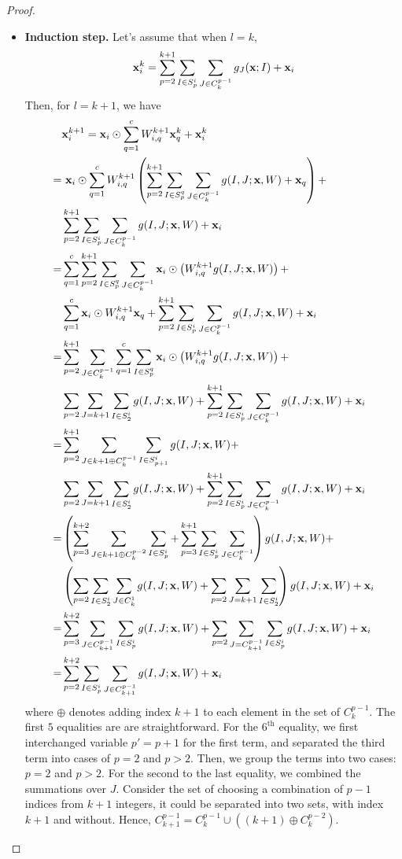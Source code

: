 \documentclass[sigconf]{acmart}
\newcommand{\vecx}{{\bf x}}
\begin{document}
\begin{proof}
\begin{itemize}[leftmargin=0em]
\item[] {\bf Induction step.} Let's assume that when $l = k$, 
$$\vecx_i^k = \sum_{p=2}^{k+1} \sum_{I \in S_p^i} \sum_{J \in C_k^{p-1}} g_J(\vecx; I) + \vecx_i
$$
Then, for $l = k+1$, we have 
\begin{align*}
&\vecx_{i}^{k+1} = \vecx_i \odot \sum_{q=1}^c W_{i, q}^{k+1} \vecx_q^k + \vecx_i^k \\ 
=& ~\vecx_i \odot \sum_{q=1}^c W_{i, q}^{k+1} \left(\sum_{p=2}^{k+1} \sum_{I \in S_p^q} \sum_{J \in C_k^{p-1}} g(I, J; \vecx, W) + \vecx_q\right) + \\
& \sum_{p=2}^{k+1} \sum_{I \in S_p^i} \sum_{J \in C_k^{p-1}} g(I, J; \vecx, W) + \vecx_i \\
=& \sum_{q=1}^c \sum_{p=2}^{k+1} \sum_{I \in S_p^q} \sum_{J \in C_k^{p-1}} \vecx_i \odot \left(W_{i, q}^{k+1} g(I, J; \vecx, W)\right) + \\ 
& \sum_{q=1}^c \vecx_i \odot W_{i, q}^{k+1}\vecx_q+  \sum_{p=2}^{k+1} \sum_{I \in S_p^i } \sum_{J \in C_k^{p-1}} g(I, J; \vecx, W) + \vecx_i\\ 
=&  \sum_{p=2}^{k+1} \sum_{J \in C_k^{p-1}} \sum_{q=1}^c \sum_{I \in S_p^q} \vecx_i \odot \left(W_{i, q}^{k+1} g(I, J; \vecx, W)\right) +\\
& \sum_{p=2} \sum_{J=k+1} \sum_{I \in S_2^i}g(I, J; \vecx, W)+ \sum_{p=2}^{k+1} \sum_{I \in S_p^i } \sum_{J \in C_k^{p-1}} g(I, J; \vecx, W) + \vecx_i\\ 
=&  \sum_{p=2}^{k+1} \sum_{J \in {k+1} \oplus C_k^{p-1}} \sum_{I \in S_{p+1}^i} g(I, J; \vecx, W)+\\
& \sum_{p=2} \sum_{J=k+1} \sum_{I \in S_2^i}g(I, J; \vecx, W)+ \sum_{p=2}^{k+1} \sum_{I \in S_p^i } \sum_{J \in C_k^{p-1}} g(I, J; \vecx, W) + \vecx_i \\ 
=&  \left(\sum_{p=3}^{k+2} \sum_{J \in {k+1} \oplus C_k^{p-2}} \sum_{I \in S_{p}^i}+\sum_{p=3}^{k+1} \sum_{I \in S_p^i } \sum_{J \in C_k^{p-1}}\right) g(I, J; \vecx, W)+\\
& \left(\sum_{p=2} \sum_{I \in S_2^i } \sum_{J \in C_k^1} g(I, J; \vecx, W) + \sum_{p=2} \sum_{J=k+1} \sum_{I \in S_2^i} \right)g(I, J; \vecx, W)+\vecx_i\\
=& \sum_{p=3}^{k+2} \sum_{J \in C_{k+1}^{p-1}} \sum_{I \in S_{p}^i}g(I, J; \vecx, W) +\sum_{p=2} \sum_{J=C_{k+1}^{p-1}} \sum_{I \in S_p^i} g(I, J; \vecx, W)+\vecx_i\\ 
=& \sum_{p=2}^{k+2} \sum_{I \in S_p^i } \sum_{J \in C_{k+1}^{p-1}} g(I, J; \vecx, W) + \vecx_i
\end{align*}
where $\oplus$ denotes adding index $k+1$ to each element in the set of $C_{k}^{p-1}$. The first $5$ equalities are are straightforward.
For the $6^\text{th}$ equality, we first interchanged variable $p' = p+1$ for the first term, and separated the third term into cases of $p=2$ and $p > 2$. Then, we group the terms into two cases: $p=2$ and $p>2$. 
For the second to the last equality, we combined the summations over $J$. Consider the set of choosing a combination of $p-1$ indices from $k+1$ integers, it could be separated into two sets, with index $k+1$ and without. Hence, $C_{k+1}^{p-1} = C_{k}^{p-1} \cup \left((k+1) \oplus C_{k}^{p-2}\right)$. 


\end{itemize}
\end{proof}
\end{document}
